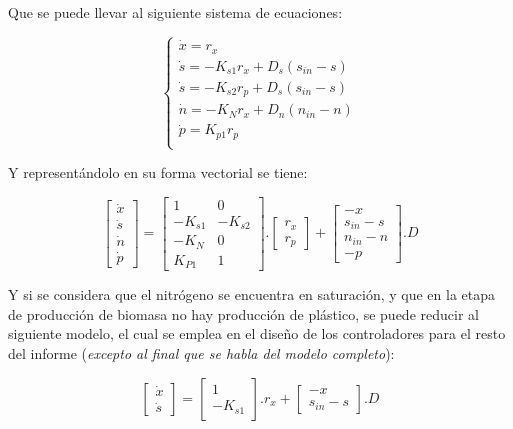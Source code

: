 \documentclass[letterpaper, 10 pt, conference]{ieeeconf}  %
\begin{document}
Que se puede llevar al siguiente sistema de ecuaciones:

\begin{equation*}
	\begin{cases}
    \dot{x} = r_{x} \\
    \dot{s} = -K_{s1}r_{x}  + D_{s}(s_{in}  - s) \\
    \dot{s} = -K_{s2}r_{p}  + D_{s}(s_{in}  - s) \\
    \dot{n} = -K_{N}r_{x}  + D_{n}(n_{in}  - n) \\
    \dot{p} = K_{p1}r_{p} \\
	\end{cases}
\end{equation*}

Y representándolo en su forma vectorial se tiene:

\begin{equation}
\begin{bmatrix} \dot{x} \\ \dot{s} \\ \dot{n} \\ \dot{p} \end{bmatrix}
=
\begin{bmatrix} 1 & 0 \\ -K_{s1} & -K_{s2} \\ -K_{N} & 0 \\ K_{P1} & 1 \end{bmatrix}
.
\begin{bmatrix} r_{x} \\ r_{p} \end{bmatrix}
+
\begin{bmatrix} -x \\ s_{in}-s \\ n_{in}-n \\ -p \end{bmatrix}
.
D
\end{equation}

Y si se considera que el nitrógeno se encuentra en saturación, y que en la etapa de producción de biomasa no hay producción de plástico, se puede reducir al siguiente modelo, el cual se emplea en el diseño de los controladores para el resto del informe (\textit{excepto al final que se habla del modelo completo}):

\vspace{0.35cm}

\begin{equation}
\begin{bmatrix} \dot{x} \\ \dot{s} \end{bmatrix}
=
\begin{bmatrix} 1 \\ -K_{s1} \end{bmatrix}
.
r_{x}
+
\begin{bmatrix} -x \\ s_{in}-s \end{bmatrix}
.
D
\end{equation}
\end{document}
